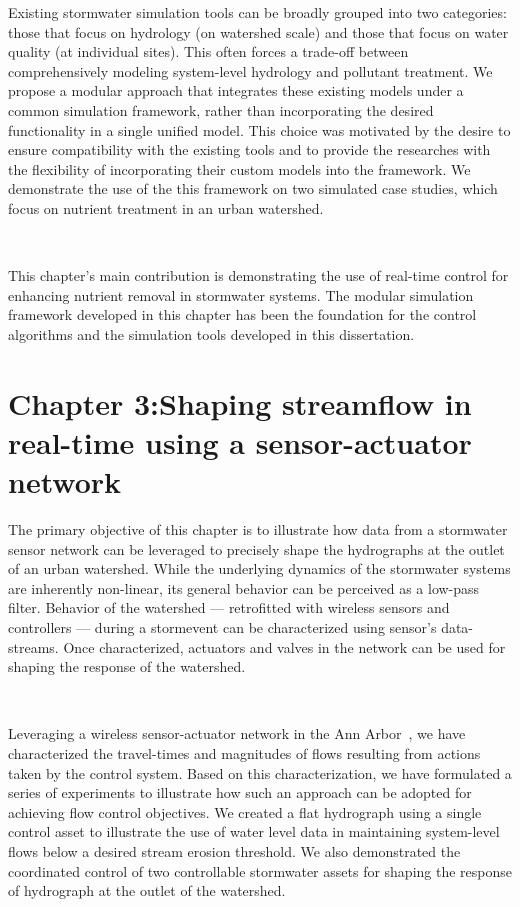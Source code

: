 Existing stormwater simulation tools can be broadly grouped into two categories: those that focus on hydrology (on watershed scale) and those that focus on water quality (at individual sites).
This often forces a trade-off between comprehensively modeling system-level hydrology and pollutant treatment.
We propose a modular approach that integrates these existing models under a common simulation framework, rather than incorporating the desired functionality in a single unified model.
This choice was motivated by the desire to ensure compatibility with the existing tools and to provide the researches with the flexibility of incorporating their custom models into the framework.
We demonstrate the use of the this framework on two simulated case studies, which focus on nutrient treatment in an urban watershed.

\

This chapter's main contribution is demonstrating the use of real-time control for enhancing nutrient removal in stormwater systems. The modular simulation framework developed in this chapter has been the foundation for the control algorithms and the simulation tools developed in this dissertation. 

\section{Chapter 3:Shaping streamflow in real-time using a sensor-actuator network}

The primary objective of this chapter is to illustrate how data from a stormwater sensor network can be leveraged to precisely shape the hydrographs at the outlet of an urban watershed.
While the underlying dynamics of the stormwater systems are inherently non-linear, its general behavior can be perceived as a low-pass filter.
Behavior of the watershed --- retrofitted with wireless sensors and controllers --- during a stormevent can be characterized using sensor's data-streams.
Once characterized, actuators and valves in the network can be used for shaping the response of the watershed.

\

Leveraging a wireless sensor-actuator network in the Ann Arbor~\cite{Bartos_2018}, we have characterized the travel-times and magnitudes of flows resulting from actions taken by the control system.
Based on this characterization, we have formulated a series of experiments to illustrate how such an approach can be adopted for achieving flow control objectives.
We created a flat hydrograph using a single control asset to illustrate the use of water level data in maintaining system-level flows below a desired stream erosion threshold.
We also demonstrated the coordinated control of two controllable stormwater assets for shaping the response of hydrograph at the outlet of the watershed.

